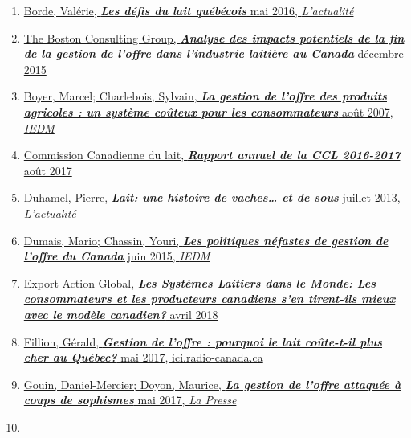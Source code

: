 \documentclass[11pt]{article}
\providecommand{\tightlist}{%
      \setlength{\itemsep}{0pt}\setlength{\parskip}{0pt}}
\begin{document}
    \begin{enumerate}
\def\labelenumi{\arabic{enumi}.}
\tightlist
\item
  \href{https://lactualite.com/societe/2016/05/10/les-defis-du-lait-quebecois/}{Borde,
  Valérie, \textbf{\emph{Les défis du lait québécois}} mai 2016,
  \emph{L'actualité}}
\item
  \href{https://www.agrireseau.net/economie-et-gestion/documents/91368}{The
  Boston Consulting Group, \textbf{\emph{Analyse des impacts potentiels
  de la fin de la gestion de l'offre dans l'industrie laitière au
  Canada}} décembre 2015}
\item
  \href{https://www.iedm.org/fr/588-la-gestion-de-loffre-des-produits-agricoles-un-systeme-couteux-pour-les-consommateurs}{Boyer,
  Marcel; Charlebois, Sylvain, \textbf{\emph{La gestion de l'offre des
  produits agricoles : un système coûteux pour les consommateurs}} août
  2007, \emph{IEDM}}
\item
  \href{http://www.cdc-ccl.gc.ca/CDC/index-fra.php?link=125}{Commission
  Canadienne du lait, \textbf{\emph{Rapport annuel de la CCL 2016-2017}}
  août 2017}
\item
  \href{https://lactualite.com/lactualite-affaires/2013/07/23/le-lait-une-histoire-de-vaches-et-de-sous/}{Duhamel,
  Pierre, \textbf{\emph{Lait: une histoire de vaches\ldots{} et de
  sous}} juillet 2013, \emph{L'actualité}}
\item
  \href{http://www.iedm.org/fr/53769-le-point-les-politiques-nefastes-de-gestion-de-l-offre-du-Canada}{Dumais,
  Mario; Chassin, Youri, \textbf{\emph{Les politiques néfastes de
  gestion de l'offre du Canada}} juin 2015, \emph{IEDM}}
\item
  \href{https://www.exportactionglobal.com/dairyreport/}{Export Action
  Global, \textbf{\emph{Les Systèmes Laitiers dans le Monde: Les
  consommateurs et les producteurs canadiens s'en tirent-ils mieux avec
  le modèle canadien?}} avril 2018}
\item
  \href{https://ici.radio-canada.ca/nouvelle/1036806/gestion-de-offre-pourquoi-lait-coute-plus-cher-au-quebec}{Fillion,
  Gérald, \textbf{\emph{Gestion de l'offre : pourquoi le lait coûte-t-il
  plus cher au Québec?}} mai 2017, ici.radio-canada.ca}
\item
  \href{http://plus.lapresse.ca/screens/c41361e6-1861-4267-b962-f87e74a758d0__7C___0.html}{Gouin,
  Daniel-Mercier; Doyon, Maurice, \textbf{\emph{La gestion de l'offre
  attaquée à coups de sophismes}} mai 2017, \emph{La Presse}}
\item

\end{enumerate}
\end{document}
